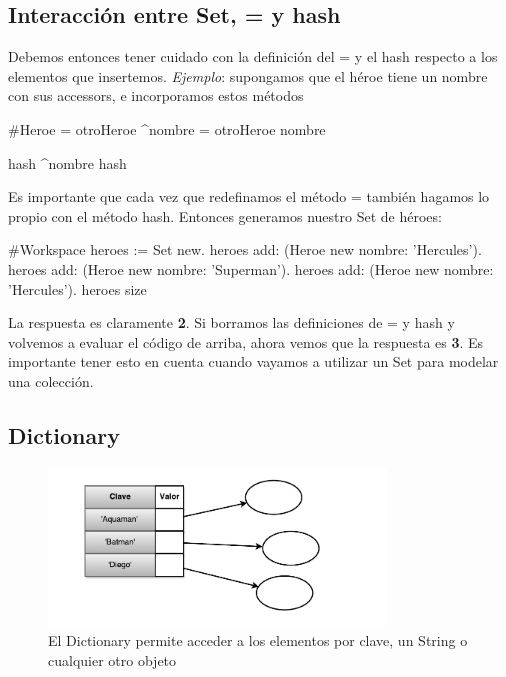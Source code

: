 \documentclass[a4paper,12pt]{book}
\begin{document}
\subsection{Interacción entre Set, = y hash}
Debemos entonces tener cuidado con la definición del = y el hash respecto a los elementos que insertemos.
\textit{Ejemplo}: supongamos que el héroe tiene un nombre con sus accessors, e incorporamos estos métodos

\begin{code}
#Heroe
= otroHeroe
    ^nombre = otroHeroe nombre
    
hash
    ^nombre hash
\end{code}

Es importante que cada vez que redefinamos el método = también hagamos lo propio con el método hash.
Entonces generamos nuestro Set de héroes:

\begin{code}
#Workspace
heroes := Set new.
heroes add: (Heroe new nombre: 'Hercules').
heroes add: (Heroe new nombre: 'Superman').
heroes add: (Heroe new nombre: 'Hercules').
heroes size
\end{code}

La respuesta es claramente \textbf{2}. Si borramos las definiciones de = y hash y volvemos a evaluar 
el código de arriba, ahora vemos que la respuesta es \textbf{3}. Es importante tener esto en cuenta cuando
vayamos a utilizar un Set para modelar una colección.

\subsection{Dictionary}

\begin{figure}[h!]
    \centering
    \includegraphics[width=0.8\textwidth]{images/40_Dictionary.pdf}
    \caption{El Dictionary permite acceder a los elementos por clave, un String o cualquier otro objeto}
\end{figure}
\FloatBarrier
\end{document}
